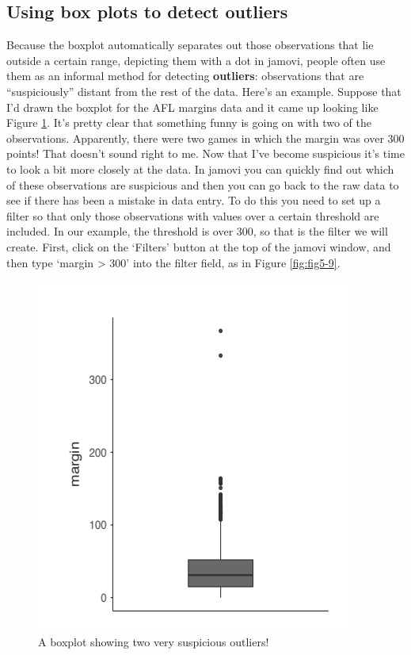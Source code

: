 \documentclass[
]{book}
\begin{document}
\hypertarget{using-box-plots-to-detect-outliers}{%
\subsection{Using box plots to detect outliers}\label{using-box-plots-to-detect-outliers}}

Because the boxplot automatically separates out those observations that lie outside a certain range, depicting them with a dot in jamovi, people often use them as an informal method for detecting \textbf{outliers}: observations that are ``suspiciously'' distant from the rest of the data. Here's an example. Suppose that I'd drawn the boxplot for the AFL margins data and it came up looking like Figure \ref{fig:fig5-8}. It's pretty clear that something funny is going on with two of the observations. Apparently, there were two games in which the margin was over 300 points! That doesn't sound right to me. Now that I've become suspicious it's time to look a bit more closely at the data. In jamovi you can quickly find out which of these observations are suspicious and then you can go back to the raw data to see if there has been a mistake in data entry. To do this you need to set up a filter so that only those observations with values over a certain threshold are included. In our example, the threshold is over 300, so that is the filter we will create. First, click on the `Filters' button at the top of the jamovi window, and then type `margin \textgreater{} 300' into the filter field, as in Figure \ref{fig:fig5-9}.

\begin{figure}
\includegraphics[width=0.9\linewidth]{images/Figure29} \caption{A boxplot showing two very suspicious outliers!}\label{fig:fig5-8}
\end{figure}
\end{document}
